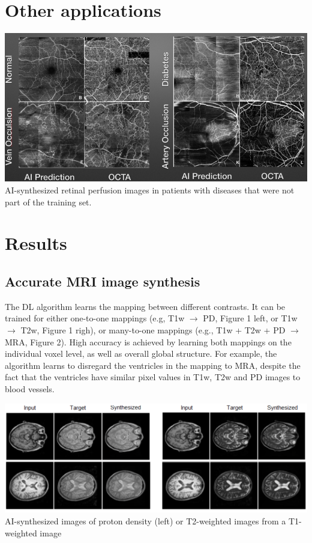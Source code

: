 \documentclass[a0, landscape]{a0poster}
\begin{document}
\begin{multicols}{3}
\section*{Other applications}

\begin{minipage}[t]{1\linewidth}
\includegraphics[width=18cm]{octa.png}
\\
AI-synthesized retinal perfusion images in patients with diseases that were not part of the training set.
\end{minipage}
\columnbreak

\color{Navy}
\section*{Results}

\subsection*{Accurate MRI image synthesis}

The DL algorithm learns the mapping between different contrasts. It can be trained for either one-to-one mappings (e.g, T1w $\rightarrow$ PD, Figure 1 left, or T1w $\rightarrow$ T2w, Figure 1 righ), or many-to-one mappings (e.g., T1w + T2w + PD $\rightarrow$ MRA, Figure 2). High accuracy is achieved by learning both mappings on the individual voxel level, as well as overall global structure. For example, the algorithm learns to disregard the ventricles in the mapping to MRA, despite the fact that the ventricles have similar pixel values in T1w, T2w and PD images to blood vessels.

\begin{minipage}[b]{1.0\linewidth}
  \includegraphics[width=\linewidth]{mri2mri.png}
  \center AI-synthesized images of proton density (left) or T2-weighted images from a T1-weighted image
\end{minipage}


\end{multicols}
\end{document}
